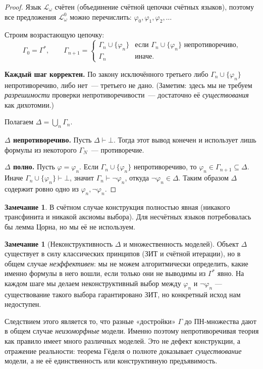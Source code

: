 \documentclass[12pt, a4paper]{article}
\theoremstyle{plain}
\theoremstyle{definition}
\newtheorem{remark}[theorem]{Замечание}
\newcommand{\proves}{\vdash}
\newcommand{\Lw}{\mathcal{L}_\omega}
\begin{document}
\begin{proof}
Язык $\Lw$ счётен (объединение счётной цепочки счётных языков),
поэтому все предложения $\Lw^0$ можно перечислить:
$\varphi_0, \varphi_1, \varphi_2, \ldots$

Строим возрастающую цепочку:
\[
  \Gamma_0 = \Gamma^*, \qquad
  \Gamma_{n+1} =
  \begin{cases}
    \Gamma_n \cup \{\varphi_n\} & \text{если } \Gamma_n \cup \{\varphi_n\}
    \text{ непротиворечиво,}\\
    \Gamma_n & \text{иначе.}
  \end{cases}
\]

\textbf{Каждый шаг корректен.}
По закону исключённого третьего либо $\Gamma_n \cup \{\varphi_n\}$
непротиворечиво, либо нет~--- третьего не дано.
(Заметим: здесь мы не требуем \emph{разрешимости} проверки непротиворечивости~---
достаточно её \emph{существования} как дихотомии.)

Полагаем $\Delta = \bigcup_{n} \Gamma_n$.

\textbf{$\Delta$ непротиворечиво.}
Пусть $\Delta \proves \bot$. Тогда этот вывод конечен и использует
лишь формулы из некоторого $\Gamma_N$~--- противоречие.

\textbf{$\Delta$ полно.}
Пусть $\varphi = \varphi_n$. Если $\Gamma_n \cup \{\varphi_n\}$ непротиворечиво,
то $\varphi_n \in \Gamma_{n+1} \subseteq \Delta$.
Иначе $\Gamma_n \cup \{\varphi_n\} \proves \bot$, значит $\Gamma_n \proves \neg\varphi_n$,
откуда $\neg\varphi_n \in \Delta$.
Таким образом $\Delta$ содержит ровно одно из $\varphi_n, \neg\varphi_n$.
\end{proof}

\begin{remark}
В счётном случае конструкция полностью явная (никакого трансфинита
и никакой аксиомы выбора). Для несчётных языков потребовалась бы
лемма Цорна, но мы её не используем.
\end{remark}

\begin{remark}[Неконструктивность $\Delta$ и множественность моделей]
Объект $\Delta$ существует в силу классических принципов (ЗИТ и счётной
итерации), но в общем случае \emph{неэффективен}: мы не можем алгоритмически
определить, какие именно формулы в него вошли, если только они не выводимы
из $\Gamma^*$ явно. На каждом шаге мы делаем неконструктивный выбор между
$\varphi_n$ и $\neg\varphi_n$ — существование такого выбора гарантировано
ЗИТ, но конкретный исход нам недоступен.

Следствием этого является то, что разные «достройки» $\Gamma$ до
ПН-множества дают в общем случае \emph{неизоморфные} модели. Именно поэтому
непротиворечивая теория как правило имеет много различных моделей.
Это не дефект конструкции, а отражение реальности: теорема Гёделя
о полноте доказывает \emph{существование} модели, а не её
единственность или конструктивную предъявимость.
\end{remark}
\end{document}
